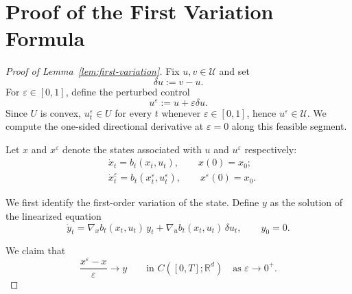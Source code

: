 \documentclass[11pt]{amsart}
\theoremstyle{plain}
\theoremstyle{definition}
\theoremstyle{remark}
\begin{document}
\section{Proof of the First Variation Formula}\label{sec:prf}
\begin{proof}[Proof of Lemma~\ref{lem:first-variation}]
Fix $u,v\in\mathcal U$ and set
\[
\delta u := v-u.
\]
For $\varepsilon \in [0,1]$, define the perturbed control
\[
u^\varepsilon := u+\varepsilon \delta u.
\]
Since $U$ is convex, $u^\varepsilon_t\in U$ for every $t$ whenever $\varepsilon\in[0,1]$,
hence $u^\varepsilon\in\mathcal U$. We compute the one-sided directional derivative at $\varepsilon=0$ along this feasible segment.

Let $x$ and $x^\varepsilon$ denote the states associated with $u$ and $u^\varepsilon$ respectively:
\begin{align*}
& \dot x_t=b_t(x_t,u_t),
\qquad
x(0)=x_0; \\
& \dot x_t^\varepsilon=b_t(x_t^\varepsilon,u_t^\varepsilon),
\qquad
x^\varepsilon(0)=x_0.
\end{align*}

We first identify the first-order variation of the state.
Define $y$ as the solution of the linearized equation
\begin{equation}\label{eq:linearized-state}
\dot y_t
=
\nabla_x b_t(x_t,u_t)\,y_t+\nabla_u b_t(x_t,u_t)\,\delta u_t,
\qquad
y_0=0.
\end{equation}

We claim that
\begin{equation}\label{eq:state-diff-quotient}
\frac{x^\varepsilon-x}{\varepsilon}\to y
\qquad\text{in } C([0,T];\mathbb R^d)
\quad\text{as }\varepsilon\to 0^+.
\end{equation}


\end{proof}
\end{document}
